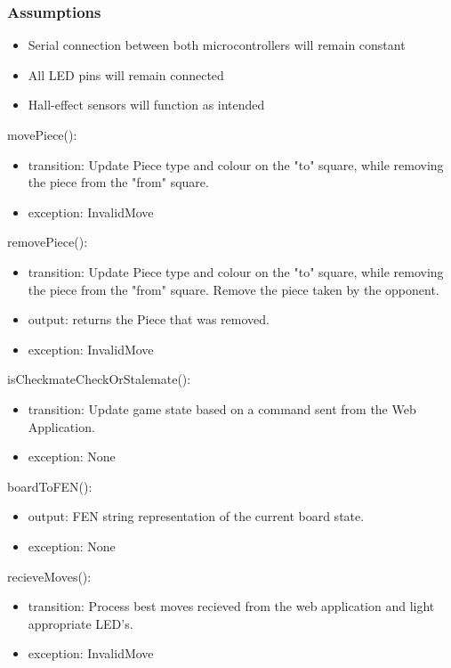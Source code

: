 \documentclass[12pt, titlepage]{article}
\begin{document}
\subsubsection{Assumptions}{
  \begin{itemize}
    \item Serial connection between both microcontrollers will remain constant
    \item All LED pins will remain connected
    \item Hall-effect sensors will function as intended
  \end{itemize}
}
\noindent movePiece():
\begin{itemize}
\item transition: Update Piece type and colour on the "to" square, while removing the piece from the "from" square.
\item exception: InvalidMove
\end{itemize}

\noindent removePiece():
\begin{itemize}
\item transition: Update Piece type and colour on the "to" square, while removing the piece from the "from" square. Remove the piece taken by the opponent.
\item output: returns the Piece that was removed.
\item exception: InvalidMove
\end{itemize}

\noindent isCheckmateCheckOrStalemate():
\begin{itemize}
\item transition: Update game state based on a command sent from the Web Application.
\item exception: None
\end{itemize}

\noindent boardToFEN():
\begin{itemize}
\item output: FEN string representation of the current board state.
\item exception: None
\end{itemize}

\noindent recieveMoves():
\begin{itemize}
\item transition: Process best moves recieved from the web application and light appropriate LED's.
\item exception: InvalidMove
\end{itemize}
\end{document}
